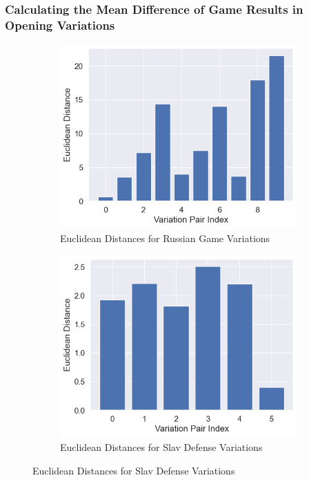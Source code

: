 \documentclass[a4paper, 11pt]{article}
\begin{document}
\subsubsection{Calculating the Mean Difference of Game Results in Opening Variations}

\begin{figure}[H]
    \centering
    \caption{Examples of Euclidean Distances for Opening Variations}
    \label{fig:euclideanDistancesForOpeningVariations}
    \begin{subfigure}{0.49\textwidth}
        \centering
        \caption{Euclidean Distances for Russian Game Variations}
        \includegraphics[width=\textwidth]{Euclidean Distances for Russian Game.png}
    \end{subfigure}
    \hfill
    \begin{subfigure}{0.49\textwidth}
        \centering
        \caption{Euclidean Distances for Slav Defense Variations}
        \includegraphics[width=\textwidth]{Euclidean Distances for Slav Defense.png}
    \end{subfigure}
\end{figure}
\end{document}
